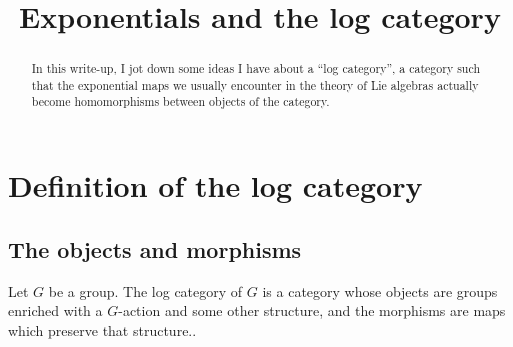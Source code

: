 \documentclass[a4paper]{amsart}
\title{Exponentials and the log category}
\begin{document}
\maketitle

\begin{abstract}
  In this write-up, I jot down some ideas I have about a ``log
  category'', a category such that the exponential maps we usually
  encounter in the theory of Lie algebras actually become
  homomorphisms between objects of the category. 
\end{abstract}

\section{Definition of the log category}

\subsection{The objects and morphisms}

Let $G$ be a group. The log category of $G$ is a category whose
objects are groups enriched with a $G$-action and some other
structure, and the morphisms are maps which preserve that structure..
\end{document}
